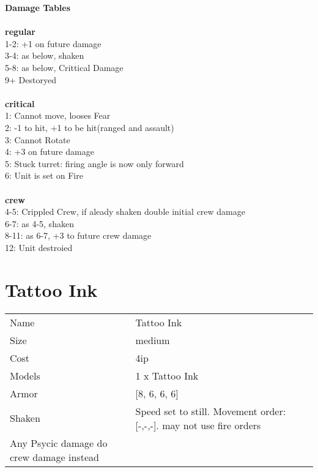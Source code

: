 {\bf Damage Tables} \\
\ \\ {\bf regular } \\
1-2: +1 on future damage \\
3-4: as below, shaken \\
5-8: as below, Crittical Damage \\
9+ Destoryed \\
\ \\ {\bf critical } \\
1: Cannot move, looses Fear \\
2: -1 to hit, +1 to be hit(ranged and assault) \\
3: Cannot Rotate \\
4: +3 on future damage \\
5: Stuck turret: firing angle is now only forward \\
6: Unit is set on Fire \\
\ \\ {\bf crew } \\
4-5: Crippled Crew, if aleady shaken double initial crew damage \\
6-7: as 4-5, shaken \\
8-11: as 6-7, +3 to future crew damage \\
12: Unit destroied \\










\pagebreak\pagebreak

\section{ Tattoo Ink }

\begin{tabular}{ll}
  Name & Tattoo Ink \\
  Size & medium\\
  Cost & 4ip\\
  Models & 1 x Tattoo Ink\\
  Armor & [8, 6, 6, 6]\\
  Shaken & Speed set to still. Movement order: [-,-,-]. may not use fire orders \ \\ Any Psycic damage do crew damage instead\\
\end{tabular}

\noindent 

